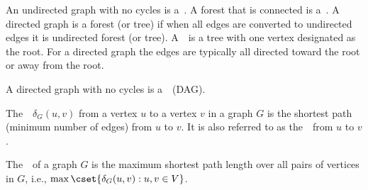 \begin{cluster}
\label{grp:def:bg::graphs::trees-and-forests}

\begin{definition}
\label{def:bg::graphs::trees-and-forests}
An undirected graph with no cycles is a~.
A forest that is connected is a~.  
A directed graph is a forest (or tree) if when all edges are converted
to undirected edges it is undirected forest (or tree).  
A~~is a tree with one vertex designated as the root.
For a directed graph the edges are typically all directed toward the
root or away from the root.

\end{definition}
\end{cluster}

\begin{cluster}
\label{grp:def:bg::graphs::directed-acyclic-graphs}

\begin{definition}
\label{def:bg::graphs::directed-acyclic-graphs}
A directed graph with no cycles is a~~(DAG).

\end{definition}
\end{cluster}

\begin{cluster}
\label{grp:def:bg::graphs::distance}

\begin{definition}[Distance]
\label{def:bg::graphs::distance}
The~~$\delta_G(u,v)$ from a vertex $u$ to a vertex $v$
in a graph $G$ is the shortest path (minimum number of edges) from $u$
to $v$.  It is also referred to as the~~from $u$ to $v$.

\end{definition}
\end{cluster}

\begin{cluster}
\label{grp:def:bg::graphs::diameter}

\begin{definition}[Diameter]
\label{def:bg::graphs::diameter}
The~~of a graph $G$ is the maximum shortest path length over all
pairs of vertices in $G$, i.e., $\max\cset{\delta_G(u,v) : u, v \in V}$.

\end{definition}
\end{cluster}

